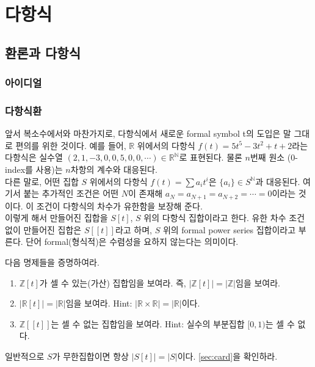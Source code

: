 \part{다항식}
\chapter{환론과 다항식}
\section{아이디얼}
\section{다항식환}\label{sec:polyring}

앞서 복소수에서와 마찬가지로, 다항식에서 새로운 formal symbol t의 도입은 말 그대로 편의를 위한 것이다. 예를 들어, $\mathbb{R}$ 위에서의 다항식 $f(t)=5t^5-3t^2+t+2$라는 다항식은 실수열 $(2, 1, -3, 0, 0, 5, 0, 0, \cdots)\in \mathbb{R}^\mathbb{N}$로 표현된다. 물론 $n$번째 원소 (0-index를 사용)는 $n$차항의 계수와 대응된다. \\
다른 말로, 어떤 집합 $S$ 위에서의 다항식 $f(t)=\sum{a_it^i}$은 $\{a_i\}\in S^\mathbb{N}$과 대응된다. 여기서 붙는 추가적인 조건은 어떤 $N$이 존재해 $a_N=a_{N+1}=a_{N+2}=\cdots=0$이라는 것이다. 이 조건이 다항식의 차수가 유한함을 보장해 준다. \\
이렇게 해서 만들어진 집합을 $S[t]$, $S$ 위의 다항식 집합이라고 한다. 유한 차수 조건 없이 만들어진 집합은 $S[[t]]$라고 하며, $S$ 위의 formal power series 집합이라고 부른다. 단어 formal(형식적)은 수렴성을 요하지 않는다는 의미이다. 
\begin{exercise}
다음 명제들을 증명하여라.
\begin{enumerate}[label=(\alph*)]
    \item $\mathbb{Z}[t]$가 셀 수 있는(가산) 집합임을 보여라. 즉, $|\mathbb{Z}[t]|=|\mathbb{Z}|$임을 보여라. 
    \item $|\mathbb{R}[t]|=|\mathbb{R}|$임을 보여라. Hint: $|\mathbb{R}\times\mathbb{R}|=|\mathbb{R}|$이다. 
    \item $\mathbb{Z}[[t]]$는 셀 수 없는 집합임을 보여라. Hint: 실수의 부분집합 $[0, 1)$는 셀 수 없다.
\end{enumerate}
\end{exercise}
\begin{remark}
일반적으로 $S$가 무한집합이면 항상 $|S[t]|=|S|$이다. \cref{sec:card}을 확인하라.
\end{remark}

